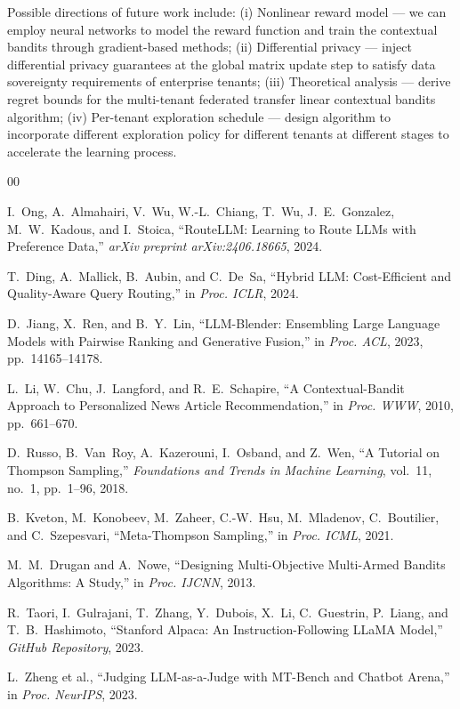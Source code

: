 \documentclass[conference]{IEEEtran}
\begin{document}
Possible directions of future work include: (i) Nonlinear reward model --- we can employ neural networks to model the reward function and train the contextual bandits through gradient-based methods; (ii) Differential privacy --- inject differential privacy guarantees at the global matrix update step to satisfy data sovereignty requirements of enterprise tenants; (iii) Theoretical analysis --- derive regret bounds for the multi-tenant federated transfer linear contextual bandits algorithm; (iv) Per-tenant exploration schedule --- design algorithm to incorporate different exploration policy for different tenants at different stages to accelerate the learning process.



\begin{thebibliography}{00}

I.~Ong, A.~Almahairi, V.~Wu, W.-L.~Chiang, T.~Wu, J.~E.~Gonzalez,
M.~W.~Kadous, and I.~Stoica,
``RouteLLM: Learning to Route LLMs with Preference Data,''
\emph{arXiv preprint arXiv:2406.18665}, 2024.

T.~Ding, A.~Mallick, B.~Aubin, and C.~De~Sa,
``Hybrid LLM: Cost-Efficient and Quality-Aware Query Routing,''
in \emph{Proc. ICLR}, 2024.

D.~Jiang, X.~Ren, and B.~Y.~Lin,
``LLM-Blender: Ensembling Large Language Models with Pairwise Ranking
and Generative Fusion,''
in \emph{Proc. ACL}, 2023, pp.~14165--14178.

L.~Li, W.~Chu, J.~Langford, and R.~E.~Schapire,
``A Contextual-Bandit Approach to Personalized News Article Recommendation,''
in \emph{Proc. WWW}, 2010, pp.~661--670.

D.~Russo, B.~Van~Roy, A.~Kazerouni, I.~Osband, and Z.~Wen,
``A Tutorial on Thompson Sampling,''
\emph{Foundations and Trends in Machine Learning}, vol.~11, no.~1,
pp.~1--96, 2018.

B.~Kveton, M.~Konobeev, M.~Zaheer, C.-W.~Hsu, M.~Mladenov,
C.~Boutilier, and C.~Szepesvari,
``Meta-Thompson Sampling,''
in \emph{Proc. ICML}, 2021.

M.~M.~Drugan and A.~Nowe,
``Designing Multi-Objective Multi-Armed Bandits Algorithms: A Study,''
in \emph{Proc. IJCNN}, 2013.

R.~Taori, I.~Gulrajani, T.~Zhang, Y.~Dubois, X.~Li, C.~Guestrin,
P.~Liang, and T.~B.~Hashimoto,
``Stanford Alpaca: An Instruction-Following LLaMA Model,''
\emph{GitHub Repository}, 2023.

L.~Zheng et al.,
``Judging LLM-as-a-Judge with MT-Bench and Chatbot Arena,''
in \emph{Proc. NeurIPS}, 2023.

\end{thebibliography}
\end{document}
